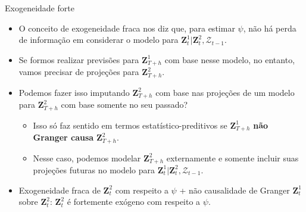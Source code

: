 \documentclass[11pt]{beamer}
\begin{document}
\begin{frame}{Exogeneidade forte}
	\begin{itemize}
		\item O conceito de exogeneidade fraca nos diz que, para estimar $\psi$, não há perda de informação em considerar o modelo para $\boldsymbol{Z}_t^1|\boldsymbol{Z}^2_t,\mathcal{Z}_{t-1}$.
		\item Se formos realizar previsões para $\boldsymbol{Z}_{T+h}^1$ com base nesse  modelo, no entanto, vamos precisar de projeções para $\boldsymbol{Z}^2_{T+h}$.
		\item Podemos fazer isso imputando $\boldsymbol{Z}^2_{T+h}$ com base nas projeções de um modelo para $\boldsymbol{Z}^2_{T+h}$ com base somente no seu passado?
		\begin{itemize}
			\item Isso só faz sentido em termos estatístico-preditivos se $\boldsymbol{Z}^1_{T+h}$ \textbf{não Granger causa} $\boldsymbol{Z}^2_{T+h}$.
			\item Nesse caso, podemos modelar $\boldsymbol{Z}^2_{T+h}$ externamente e somente incluir suas projeções futuras no modelo para $\boldsymbol{Z}_t^1|\boldsymbol{Z}^2_t,\mathcal{Z}_{t-1}$.
		\end{itemize}
		\item Exogeneidade fraca de $\boldsymbol{Z}^2_t$ com respeito a $\psi$ + não causalidade de Granger $\boldsymbol{Z}^1_t$ sobre $\boldsymbol{Z}^2_t$: $\boldsymbol{Z}^2_t$ é {\color{blue}fortemente exógeno} com respeito a $\psi$.
	\end{itemize}
\end{frame}
\end{document}
